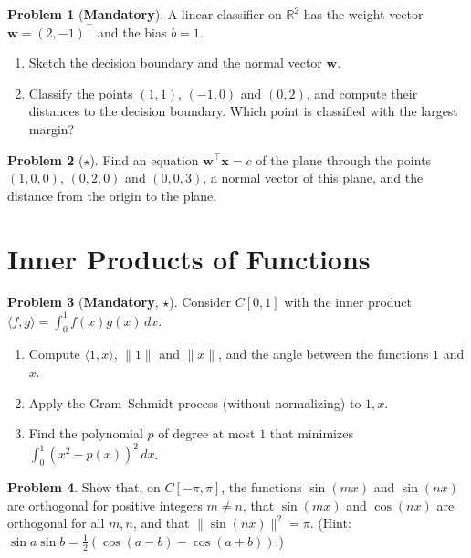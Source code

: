 \documentclass[11pt]{article}
\theoremstyle{definition}
\newtheorem{problem}{Problem}[section]
\newcommand{\mandatory}{\textcolor{red!70!black}{\textbf{Mandatory}}}
\newcommand{\norm}[1]{\lVert #1 \rVert}
\newcommand{\ip}[2]{\langle #1, #2 \rangle}
\begin{document}
\begin{problem}[\mandatory]\label{pr:classifier}
    A linear classifier on $\mathbb{R}^2$ has the weight vector $\mathbf{w} = (2, -1)^\top$ and the bias $b = 1$.
    \begin{enumerate}[label=(\alph*)]
        \item Sketch the decision boundary and the normal vector $\mathbf{w}$.
        \item Classify the points $(1, 1)$, $(-1, 0)$ and $(0, 2)$, and compute their distances to the decision boundary. Which point is classified with the largest margin?
    \end{enumerate}
\end{problem}

\begin{problem}[$\star$]\label{pr:hyperplane-form}
    Find an equation $\mathbf{w}^\top \mathbf{x} = c$ of the plane through the points $(1, 0, 0)$, $(0, 2, 0)$ and $(0, 0, 3)$, a normal vector of this plane, and the distance from the origin to the plane.
\end{problem}

\section{Inner Products of Functions}

\begin{problem}[\mandatory, $\star$]\label{pr:func-ip}
    Consider $C[0, 1]$ with the inner product $\ip{f}{g} = \int_0^1 f(x) g(x) \, dx$.
    \begin{enumerate}[label=(\alph*)]
        \item Compute $\ip{1}{x}$, $\norm{1}$ and $\norm{x}$, and the angle between the functions $1$ and $x$.
        \item Apply the Gram--Schmidt process (without normalizing) to $1, x$.
        \item Find the polynomial $p$ of degree at most $1$ that minimizes $\int_0^1 (x^2 - p(x))^2 \, dx$.
    \end{enumerate}
\end{problem}

\begin{problem}\label{pr:fourier}
    Show that, on $C[-\pi, \pi]$, the functions $\sin(mx)$ and $\sin(nx)$ are orthogonal for positive integers $m \neq n$, that $\sin(mx)$ and $\cos(nx)$ are orthogonal for all $m, n$, and that $\norm{\sin(nx)}^2 = \pi$. (Hint: $\sin a \sin b = \frac{1}{2}(\cos(a - b) - \cos(a + b))$.)
\end{problem}
\end{document}

